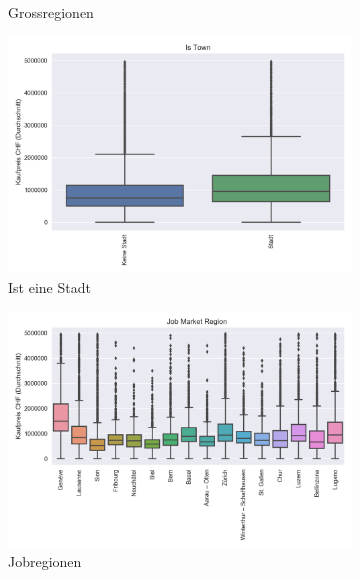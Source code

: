 \begin{figure}[h]
\begin{subfigure}{.5\textwidth}
  \caption{Grossregionen}
\end{subfigure}
\begin{subfigure}{.5\textwidth}
  \centering
  \includegraphics[width=\linewidth]{images/anhang/analysis/boxplot_is_town.png}
  \caption{Ist eine Stadt} 
\end{subfigure}
\begin{subfigure}{.5\textwidth}
  \centering
  \includegraphics[width=\linewidth]{images/anhang/analysis/boxplot_job_market_region_id.png}
  \caption{Jobregionen}
\end{subfigure}
\begin{subfigure}{.5\textwidth}
  \centering

\end{subfigure}
\end{figure}
